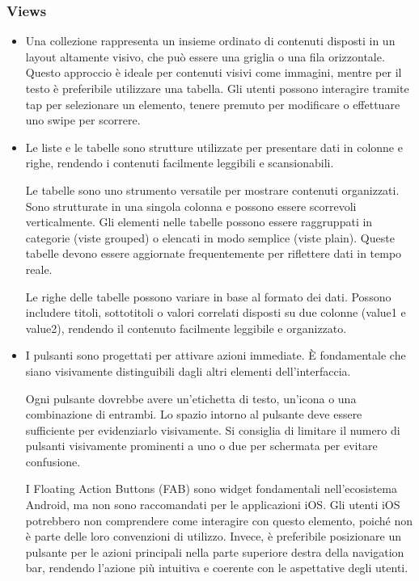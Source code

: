 \subsubsection{Views}
\begin{itemize}
    \item Una collezione rappresenta un insieme ordinato di contenuti disposti in un layout altamente visivo, che può essere una griglia o una fila orizzontale. Questo approccio è ideale per contenuti visivi come immagini, mentre per il testo è preferibile utilizzare una tabella. Gli utenti possono interagire tramite tap per selezionare un elemento, tenere premuto per modificare o effettuare uno swipe per scorrere.

    \item Le liste e le tabelle sono strutture utilizzate per presentare dati in colonne e righe, rendendo i contenuti facilmente leggibili e scansionabili.
    
    Le tabelle sono uno strumento versatile per mostrare contenuti organizzati. Sono strutturate in una singola colonna e possono essere scorrevoli verticalmente. Gli elementi nelle tabelle possono essere raggruppati in categorie (viste grouped) o elencati in modo semplice (viste plain). Queste tabelle devono essere aggiornate frequentemente per riflettere dati in tempo reale.

    Le righe delle tabelle possono variare in base al formato dei dati. Possono includere titoli, sottotitoli o valori correlati disposti su due colonne (value1 e value2), rendendo il contenuto facilmente leggibile e organizzato.

    \item I pulsanti sono progettati per attivare azioni immediate. È fondamentale che siano visivamente distinguibili dagli altri elementi dell'interfaccia.

    Ogni pulsante dovrebbe avere un'etichetta di testo, un'icona o una combinazione di entrambi. Lo spazio intorno al pulsante deve essere sufficiente per evidenziarlo visivamente. Si consiglia di limitare il numero di pulsanti visivamente prominenti a uno o due per schermata per evitare confusione.

    I Floating Action Buttons (FAB) sono widget fondamentali nell'ecosistema Android, ma non sono raccomandati per le applicazioni iOS. Gli utenti iOS potrebbero non comprendere come interagire con questo elemento, poiché non è parte delle loro convenzioni di utilizzo. Invece, è preferibile posizionare un pulsante per le azioni principali nella parte superiore destra della navigation bar, rendendo l'azione più intuitiva e coerente con le aspettative degli utenti.


\end{itemize}
